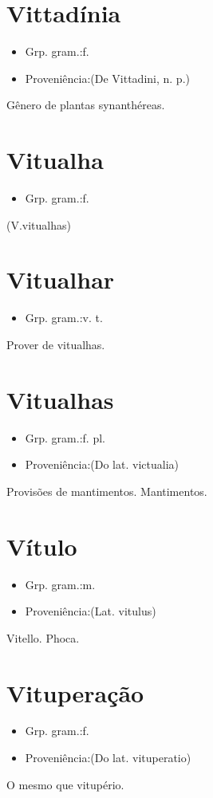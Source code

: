 \documentclass{article}
\begin{document}
\section{Vittadínia}
\begin{itemize}
\item {Grp. gram.:f.}
\end{itemize}
\begin{itemize}
\item {Proveniência:(De \textunderscore Vittadini\textunderscore , n. p.)}
\end{itemize}
Gênero de plantas synanthéreas.
\section{Vitualha}
\begin{itemize}
\item {Grp. gram.:f.}
\end{itemize}
(V.vitualhas)
\section{Vitualhar}
\begin{itemize}
\item {Grp. gram.:v. t.}
\end{itemize}
Prover de vitualhas.
\section{Vitualhas}
\begin{itemize}
\item {Grp. gram.:f. pl.}
\end{itemize}
\begin{itemize}
\item {Proveniência:(Do lat. \textunderscore victualia\textunderscore )}
\end{itemize}
Provisões de mantimentos.
Mantimentos.
\section{Vítulo}
\begin{itemize}
\item {Grp. gram.:m.}
\end{itemize}
\begin{itemize}
\item {Proveniência:(Lat. \textunderscore vitulus\textunderscore )}
\end{itemize}
Vitello.
Phoca.
\section{Vituperação}
\begin{itemize}
\item {Grp. gram.:f.}
\end{itemize}
\begin{itemize}
\item {Proveniência:(Do lat. \textunderscore vituperatio\textunderscore )}
\end{itemize}
O mesmo que \textunderscore vitupério\textunderscore .
\end{document}
